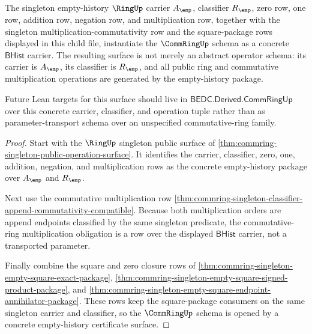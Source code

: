 \begin{theorem}
\label{thm:commring-singleton-concrete-schema-unlock}
The singleton empty-history $\RingUp$ carrier $A_{\emp}$, classifier
$R_{\emp}$, zero row, one row, addition row, negation row, and multiplication
row, together with the singleton multiplication-commutativity row and the
square-package rows displayed in this child file, instantiate the
$\CommRingUp$ schema as a concrete $\mathsf{BHist}$ carrier. The resulting
surface is not merely an abstract operator schema: its carrier is
$A_{\emp}$, its classifier is $R_{\emp}$, and all public ring and
commutative multiplication operations are generated by the empty-history
package.

Future Lean targets for this surface should live in
$\mathsf{BEDC.Derived.CommRingUp}$ over this concrete carrier, classifier, and
operation tuple rather than as parameter-transport schema over an unspecified
commutative-ring family.
\end{theorem}
\begin{proof}
Start with the $\RingUp$ singleton public surface of
\autoref{thm:commring-singleton-public-operation-surface}. It identifies the
carrier, classifier, zero, one, addition, negation, and multiplication rows as
the concrete empty-history package over $A_{\emp}$ and $R_{\emp}$.

Next use the commutative multiplication row
\autoref{thm:commring-singleton-classifier-append-commutativity-compatible}.
Because both multiplication orders are append endpoints classified by the
same singleton predicate, the commutative-ring multiplication obligation is a
row over the displayed $\mathsf{BHist}$ carrier, not a transported parameter.

Finally combine the square and zero closure rows of
\autoref{thm:commring-singleton-empty-square-exact-package},
\autoref{thm:commring-singleton-empty-square-signed-product-package}, and
\autoref{thm:commring-singleton-empty-square-endpoint-annihilator-package}.
These rows keep the square-package consumers on the same singleton carrier
and classifier, so the $\CommRingUp$ schema is opened by a concrete
empty-history certificate surface.
\end{proof}

